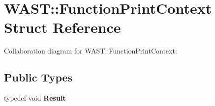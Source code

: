 \hypertarget{struct_w_a_s_t_1_1_function_print_context}{}\section{W\+A\+ST\+:\+:Function\+Print\+Context Struct Reference}
\label{struct_w_a_s_t_1_1_function_print_context}


Collaboration diagram for W\+A\+ST\+:\+:Function\+Print\+Context\+:
\subsection*{Public Types}
\begin{DoxyCompactItemize}
\item 
\mbox{\label{struct_w_a_s_t_1_1_function_print_context_a0aa9754f6a4ddda418220faf76a677a9}} 
typedef void {\bfseries Result}
\end{DoxyCompactItemize}
